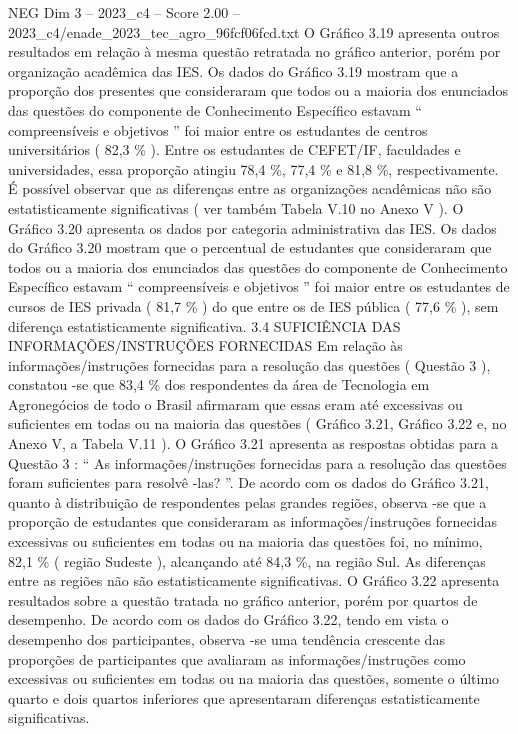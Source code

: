 \begin{textsample}{NEG Dim 3 – 2023\_c4 – Score 2.00 – 2023\_c4/enade\_2023\_tec\_agro\_96fcf06fcd.txt}
O Gráfico 3.19 apresenta outros resultados em relação à mesma questão retratada no gráfico anterior, porém por organização acadêmica das IES.
Os dados do Gráfico 3.19 mostram que a proporção dos presentes que consideraram que todos ou a maioria dos enunciados das questões do componente de Conhecimento Específico estavam “ compreensíveis e objetivos ” foi maior entre os estudantes de centros universitários ( 82,3 \% ).
Entre os estudantes de CEFET/IF, faculdades e universidades, essa proporção atingiu 78,4 \%, 77,4 \% e 81,8 \%, respectivamente.
É possível observar que as diferenças entre as organizações acadêmicas não são estatisticamente significativas ( ver também Tabela V.10 no Anexo V ).
O Gráfico 3.20 apresenta os dados por categoria administrativa das IES.
Os dados do Gráfico 3.20 mostram que o percentual de estudantes que consideraram que todos ou a maioria dos enunciados das questões do componente de Conhecimento Específico estavam “ compreensíveis e objetivos ” foi maior entre os estudantes de cursos de IES privada ( 81,7 \% ) do que entre os de IES pública ( 77,6 \% ), sem diferença estatisticamente significativa. 3.4 SUFICIÊNCIA DAS INFORMAÇÕES/INSTRUÇÕES FORNECIDAS Em relação às informações/instruções fornecidas para a resolução das questões ( Questão 3 ), constatou -se que 83,4 \% dos respondentes da área de Tecnologia em Agronegócios de todo o Brasil afirmaram que essas eram até excessivas ou suficientes em todas ou na maioria das questões ( Gráfico 3.21, Gráfico 3.22 e, no Anexo V, a Tabela V.11 ).
O Gráfico 3.21 apresenta as respostas obtidas para a Questão 3 : “ As informações/instruções fornecidas para a resolução das questões foram suficientes para resolvê -las? ”.
De acordo com os dados do Gráfico 3.21, quanto à distribuição de respondentes pelas grandes regiões, observa -se que a proporção de estudantes que consideraram as informações/instruções fornecidas excessivas ou suficientes em todas ou na maioria das questões foi, no mínimo, 82,1 \% ( região Sudeste ), alcançando até 84,3 \%, na região Sul.
As diferenças entre as regiões não são estatisticamente significativas.
O Gráfico 3.22 apresenta resultados sobre a questão tratada no gráfico anterior, porém por quartos de desempenho.
De acordo com os dados do Gráfico 3.22, tendo em vista o desempenho dos participantes, observa -se uma tendência crescente das proporções de participantes que avaliaram as informações/instruções como excessivas ou suficientes em todas ou na maioria das questões, somente o último quarto e dois quartos inferiores que apresentaram diferenças estatisticamente significativas.

\end{textsample}
